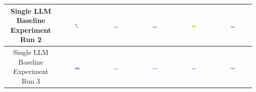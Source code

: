 \begin{table}[H]
\begin{tabular}{|c|c|c|c|c|c|}
    \hline
    Single LLM Baseline Experiment Run 2 & \includegraphics[width=0.15\textwidth]{./run_2/png/gpt-4o_results/Arrow.png} & \includegraphics[width=0.15\textwidth]{./run_2/png/claude-3-5-sonnet-20240620_results/Arrow.png} & \includegraphics[width=0.15\textwidth]{./run_2/png/watsonx_meta-llama_llama-3-1-70b-instruct_results/Arrow.png} & \includegraphics[width=0.15\textwidth]{./run_2/png/watsonx_meta-llama_llama-3-405b-instruct_results/Arrow.png} & \includegraphics[width=0.15\textwidth]{./run_2/png/o1-preview_results/Arrow.png} \\
    \hline
    Single LLM Baseline Experiment Run 3 & \includegraphics[width=0.15\textwidth]{./run_3/png/gpt-4o_results/Arrow.png} & \includegraphics[width=0.15\textwidth]{./run_3/png/claude-3-5-sonnet-20240620_results/Arrow.png} & \includegraphics[width=0.15\textwidth]{./run_3/png/watsonx_meta-llama_llama-3-1-70b-instruct_results/Arrow.png} & \includegraphics[width=0.15\textwidth]{./run_3/png/watsonx_meta-llama_llama-3-405b-instruct_results/Arrow.png} & \includegraphics[width=0.15\textwidth]{./run_3/png/o1-preview_results/Arrow.png} \\

\end{tabular}
\end{table}
